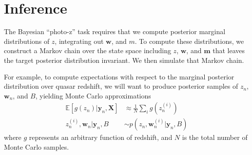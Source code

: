 \documentclass{article} %
\begin{document}

\begin{table}[t]
\caption{%
Top: mean absolute and mean absolute percentage error of photometric redshift predictions with respect to spectroscopic ``ground truth''.
Bottom: number of predicted values covered by posterior sample quantiles of varying size. }
\label{tab:error}
\vskip 0in
\begin{center}
\begin{small}
\begin{sc}
\begin{center}

\end{center}
\end{sc}
\end{small}
\end{center}
\vskip -0.1in
\end{table}


\section{Inference}
\label{sec:inference}
The Bayesian ``photo-z'' task requires that we compute posterior marginal distributions of $z$, integrating out $\mathbf{w}$, and $m$.  
To compute these distributions, we construct a Markov chain over the state space including $z$, $\mathbf{w}$, and $\mathbf{m}$ that leaves the target posterior distribution invariant.
We then simulate that Markov chain.  
 
For example, to compute expectations with respect to the marginal posterior distribution over quasar redshift, we will want to produce posterior samples of $z_n$, $\mathbf{w}_n$, and $B$, yielding Monte Carlo approximations
\begin{align}
  \mathbb{E}[ g(z_n) | \mathbf{y}_n, \mathbf{X} ] 
    &\approx \frac{1}{N} \sum_{i} g(z_n^{(i)}) \\
    z_n^{(i)}, \mathbf{w}_n | \mathbf{y}_n, B &\sim p(z_n, \mathbf{w}_n^{(i)} | \mathbf{y}_n, B) 
\end{align}
where $g$ represents an arbitrary function of redshift, and $N$ is the total number of Monte Carlo samples.  
\end{document}

